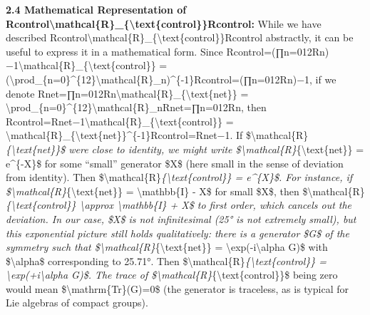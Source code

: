 \documentclass[]{article}
\begin{document}
\textbf{2.4 Mathematical Representation of
Rcontrol\textbackslash{}mathcal\{R\}\_\{\textbackslash{}text\{control\}\}Rcontrol​:}
While we have described
Rcontrol\textbackslash{}mathcal\{R\}\_\{\textbackslash{}text\{control\}\}Rcontrol​
abstractly, it can be useful to express it in a mathematical form. Since
Rcontrol=(∏n=012Rn)−1\textbackslash{}mathcal\{R\}\_\{\textbackslash{}text\{control\}\}
=
(\textbackslash{}prod\_\{n=0\}\^{}\{12\}\textbackslash{}mathcal\{R\}\_n)\^{}\{-1\}Rcontrol​=(∏n=012​Rn​)−1,
if we denote
Rnet=∏n=012Rn\textbackslash{}mathcal\{R\}\_\{\textbackslash{}text\{net\}\}
=
\textbackslash{}prod\_\{n=0\}\^{}\{12\}\textbackslash{}mathcal\{R\}\_nRnet​=∏n=012​Rn​,
then
Rcontrol=Rnet−1\textbackslash{}mathcal\{R\}\_\{\textbackslash{}text\{control\}\}
=
\textbackslash{}mathcal\{R\}\_\{\textbackslash{}text\{net\}\}\^{}\{-1\}Rcontrol​=Rnet−1​.
If \$\textbackslash{}mathcal\{R\}\emph{\{\textbackslash{}text\{net\}\}\$
were close to identity, we might write
\$\textbackslash{}mathcal\{R\}}\{\textbackslash{}text\{net\}\} =
e\^{}\{-X\}\$ for some ``small'' generator \$X\$ (here small in the
sense of deviation from identity). Then
\$\textbackslash{}mathcal\{R\}\emph{\{\textbackslash{}text\{control\}\}
= e\^{}\{X\}\$. For instance, if
\$\textbackslash{}mathcal\{R\}}\{\textbackslash{}text\{net\}\} =
\textbackslash{}mathbb\{I\} - X\$ for small \$X\$, then
\$\textbackslash{}mathcal\{R\}\emph{\{\textbackslash{}text\{control\}\}
\textbackslash{}approx \textbackslash{}mathbb\{I\} + X\$ to first order,
which cancels out the deviation. In our case, \$X\$ is not infinitesimal
(25° is not extremely small), but this exponential picture still holds
qualitatively: there is a generator \$G\$ of the symmetry such that
\$\textbackslash{}mathcal\{R\}}\{\textbackslash{}text\{net\}\} =
\textbackslash{}exp(-i\textbackslash{}alpha G)\$ with
\$\textbackslash{}alpha\$ corresponding to 25.71°. Then
\$\textbackslash{}mathcal\{R\}\emph{\{\textbackslash{}text\{control\}\}
= \textbackslash{}exp(+i\textbackslash{}alpha G)\$. The trace of
\$\textbackslash{}mathcal\{R\}}\{\textbackslash{}text\{control\}\}\$
being zero would mean \$\textbackslash{}mathrm\{Tr\}(G)=0\$ (the
generator is traceless, as is typical for Lie algebras of compact
groups).
\end{document}
